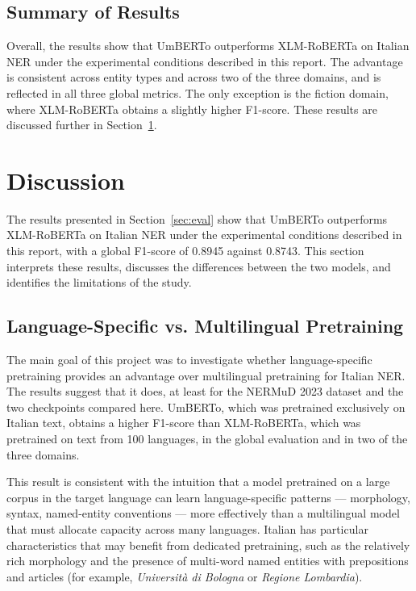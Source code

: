 \subsection{Summary of Results}
\label{subsec:eval-summary}

Overall, the results show that UmBERTo outperforms XLM-RoBERTa on Italian NER under the experimental conditions described in this report. The advantage is consistent across entity types and across two of the three domains, and is reflected in all three global metrics. The only exception is the fiction domain, where XLM-RoBERTa obtains a slightly higher F1-score. These results are discussed further in Section~\ref{sec:disc}.

\section{Discussion}
\label{sec:disc}

The results presented in Section~\ref{sec:eval} show that UmBERTo outperforms XLM-RoBERTa on Italian NER under the experimental conditions described in this report, with a global F1-score of 0.8945 against 0.8743. This section interprets these results, discusses the differences between the two models, and identifies the limitations of the study.

\subsection{Language-Specific vs. Multilingual Pretraining}
\label{subsec:disc-pretraining}

The main goal of this project was to investigate whether language-specific pretraining provides an advantage over multilingual pretraining for Italian NER. The results suggest that it does, at least for the NERMuD 2023 dataset and the two checkpoints compared here. UmBERTo, which was pretrained exclusively on Italian text, obtains a higher F1-score than XLM-RoBERTa, which was pretrained on text from 100 languages, in the global evaluation and in two of the three domains.

This result is consistent with the intuition that a model pretrained on a large corpus in the target language can learn language-specific patterns --- morphology, syntax, named-entity conventions --- more effectively than a multilingual model that must allocate capacity across many languages. Italian has particular characteristics that may benefit from dedicated pretraining, such as the relatively rich morphology and the presence of multi-word named entities with prepositions and articles (for example, \textit{Università di Bologna} or \textit{Regione Lombardia}).

